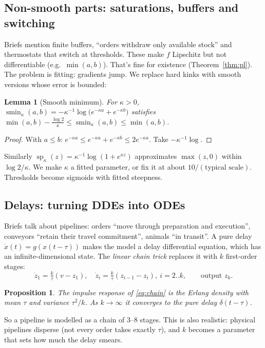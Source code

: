 \documentclass[11pt]{article}
\theoremstyle{plain}
\newtheorem{proposition}[theorem]{Proposition}
\newtheorem{lemma}[theorem]{Lemma}
\theoremstyle{definition}
\theoremstyle{remark}
\newcommand{\softmin}{\operatorname{smin}}
\newcommand{\softplus}{\operatorname{sp}}
\begin{document}
\subsection{Non-smooth parts: saturations, buffers and switching}
Briefs mention finite buffers, ``orders withdraw only available stock'' and thermostats that switch at thresholds. These make $f$ Lipschitz but not differentiable (e.g.\ $\min(a,b)$). That's fine for existence (Theorem~\ref{thm:pl}). The problem is fitting: gradients jump. We replace hard kinks with smooth versions whose error is bounded:
\begin{lemma}[Smooth minimum]
For $\kappa>0$, $\softmin_\kappa(a,b)=-\kappa^{-1}\log\!\big(e^{-\kappa a}+e^{-\kappa b}\big)$ satisfies $\min(a,b)-\tfrac{\log2}{\kappa}\le\softmin_\kappa(a,b)\le\min(a,b)$.
\end{lemma}
\begin{proof}
With $a\le b$: $e^{-\kappa a}\le e^{-\kappa a}+e^{-\kappa b}\le2e^{-\kappa a}$. Take $-\kappa^{-1}\log$.
\end{proof}
Similarly $\softplus_\kappa(z)=\kappa^{-1}\log(1+e^{\kappa z})$ approximates $\max(z,0)$ within $\log2/\kappa$. We make $\kappa$ a fitted parameter, or fix it at about $10/(\text{typical scale})$. Thresholds become sigmoids with fitted steepness.

\subsection{Delays: turning DDEs into ODEs}
Briefs talk about pipelines: orders ``move through preparation and execution'', conveyors ``retain their travel commitment'', animals ``in transit''. A pure delay $\dot x(t)=g(x(t-\tau))$ makes the model a delay differential equation, which has an infinite-dimensional state. The \emph{linear chain trick} replaces it with $k$ first-order stages:
\begin{equation}\label{eq:chain}
\dot z_1=\tfrac{k}{\tau}(v-z_1),\quad \dot z_i=\tfrac{k}{\tau}(z_{i-1}-z_i),\ i=2..k,\qquad \text{output } z_k.
\end{equation}
\begin{proposition}
The impulse response of \eqref{eq:chain} is the Erlang density with mean $\tau$ and variance $\tau^2/k$. As $k\to\infty$ it converges to the pure delay $\delta(t-\tau)$.
\end{proposition}
So a pipeline is modelled as a chain of 3--8 stages. This is also realistic: physical pipelines disperse (not every order takes exactly $\tau$), and $k$ becomes a parameter that sets how much the delay smears.
\end{document}
